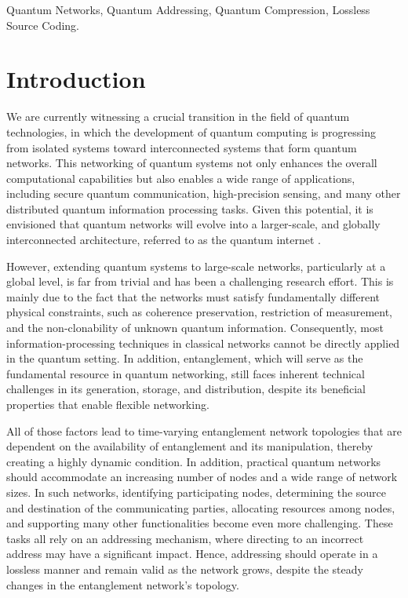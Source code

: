 \documentclass[conference]{IEEEtran}
\begin{document}
\begin{IEEEkeywords}
Quantum Networks, Quantum Addressing, Quantum Compression, Lossless Source Coding.
\end{IEEEkeywords}


\IEEEpeerreviewmaketitle
\section{Introduction}%
We are currently witnessing a crucial transition in the field of quantum technologies, in which the development of quantum computing is progressing from isolated systems toward interconnected systems that form quantum networks. This networking of quantum systems not only enhances the overall computational capabilities but also enables a wide range of applications, including secure quantum communication, high-precision sensing, and many other distributed quantum information processing tasks. Given this potential, it is envisioned that quantum networks will evolve into a larger-scale, and globally interconnected architecture, referred to as the quantum internet \cite{Kimble2008, Dur2017, Wehner2018, Cacciapuoti2020,RFC9340}.

However, extending quantum systems to large-scale networks, particularly at a global level, is far from trivial and has been a challenging research effort. This is mainly due to the fact that the networks must satisfy fundamentally different physical constraints, such as coherence preservation, restriction of measurement, and the non-clonability of unknown quantum information. Consequently, most information-processing techniques in classical networks cannot be directly applied in the quantum setting. In addition, entanglement, which will serve as the fundamental resource in quantum networking, still faces inherent technical challenges in its generation, storage, and distribution, despite its beneficial properties that enable flexible networking. 

All of those factors lead to time-varying entanglement network topologies that are dependent on the availability of entanglement and its manipulation, thereby creating a highly dynamic condition. In addition, practical quantum networks should accommodate an increasing number of nodes and a wide range of network sizes. In such networks, identifying participating nodes, determining the source and destination of the communicating parties, allocating resources among nodes, and supporting many other functionalities become even more challenging. These tasks all rely on an addressing mechanism, where directing to an incorrect address may have a significant impact. Hence, addressing should operate in a lossless manner and remain valid as the network grows, despite the steady changes in the entanglement network's topology.
\end{document}
